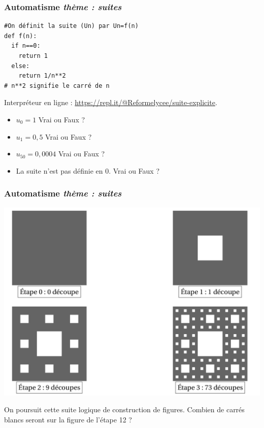 \documentclass[11pt]{beamer}
\newcounter{autocompteur}
\newcommand{\automatisme}[1]{\addtocounter{autocompteur}{1}\frametitle{Automatisme  \theautocompteur  \textit{ thème : #1}}}
\begin{document}
\begin{frame}[fragile]
\automatisme{suites}
\begin{lstlisting}
#On définit la suite (Un) par Un=f(n)
def f(n):
  if n==0:
    return 1
  else:
    return 1/n**2  
# n**2 signifie le carré de n
\end{lstlisting}

Interpr\'eteur en ligne : \url{https://repl.it/@Reformelycee/suite-explicite}.

\begin{itemize}
	\item $u_{0}=1$ Vrai ou Faux ?
	\item $u_{1}=0,5$ Vrai ou Faux ?
	\item $u_{50}=0,0004$ Vrai ou Faux ?
	\item La suite n'est pas d\'efinie en $0$. Vrai ou Faux ?
\end{itemize}
\end{frame}


\begin{frame}
\automatisme{suites}

\begin{center}
\includegraphics[scale=0.15]{ressources/sierpinski.png}
\end{center}

On poursuit cette suite logique de construction de figures. Combien de carrés blancs seront sur la figure de l'étape 12 ?
\end{frame}
\end{document}
